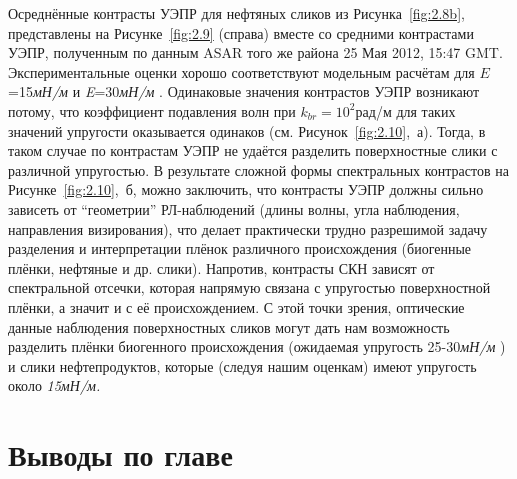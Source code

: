 Осреднённые контрасты УЭПР для нефтяных сликов из Рисунка~\ref{fig:2.8b}, представлены на Рисунке~\ref{fig:2.9} (справа) вместе со средними контрастами УЭПР, полученным по данным ASAR того же района 25 Мая 2012, 15:47 GMT. Экспериментальные оценки хорошо соответствуют модельным расчётам для $E$=15\textit{мН/м }и \textit{E}=30\textit{мН/м }. Одинаковые значения контрастов УЭПР возникают потому, что коэффициент подавления волн при $k_{br} =10^{2} $рад/м для таких значений упругости оказывается одинаков (см. Рисунок~\ref{fig:2.10},~а). Тогда, в таком случае по контрастам УЭПР не удаётся разделить поверхностные слики с различной упругостью. В результате сложной формы спектральных контрастов на Рисунке~\ref{fig:2.10},~б, можно заключить, что контрасты УЭПР должны сильно зависеть от ``геометрии'' РЛ-наблюдений (длины волны, угла наблюдения, направления визирования), что делает практически трудно разрешимой задачу разделения и интерпретации плёнок различного происхождения (биогенные плёнки, нефтяные и др. слики). Напротив, контрасты СКН зависят от спектральной отсечки, которая напрямую связана с упругостью поверхностной плёнки, а значит и с её происхождением. С этой точки зрения, оптические данные наблюдения поверхностных сликов могут дать нам возможность разделить плёнки биогенного происхождения (ожидаемая упругость 25-30\textit{мН/м }) и слики нефтепродуктов, которые (следуя нашим оценкам) имеют упругость около \textit{15мН/м.} 




\newpage



\section{Выводы по главе}



